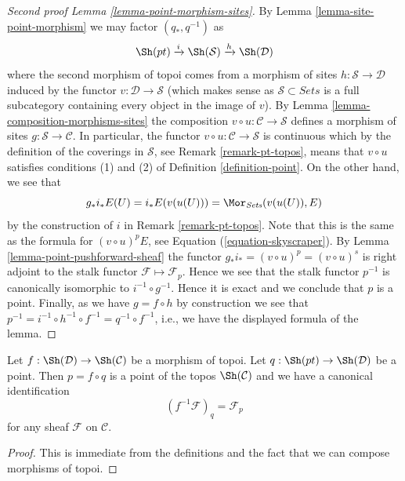 \begin{proof}[Second proof Lemma \ref{lemma-point-morphism-sites}]
By
Lemma \ref{lemma-site-point-morphism}
we may factor $(q_*, q^{-1})$ as
$$
\Sh(pt) \xrightarrow{i} \Sh(\mathcal{S})
\xrightarrow{h} \Sh(\mathcal{D})
$$
where the second morphism of topoi comes from a morphism of sites
$h : \mathcal{S} \to \mathcal{D}$ induced by the functor
$v : \mathcal{D} \to \mathcal{S}$ (which makes sense as
$\mathcal{S} \subset \textit{Sets}$ is a full subcategory containing
every object in the image of $v$). By
Lemma \ref{lemma-composition-morphisms-sites}
the composition $v \circ u : \mathcal{C} \to \mathcal{S}$
defines a morphism of sites $g : \mathcal{S} \to \mathcal{C}$.
In particular, the functor
$v \circ u : \mathcal{C} \to \mathcal{S}$
is continuous which by the definition of the coverings
in $\mathcal{S}$, see
Remark \ref{remark-pt-topos},
means that $v \circ u$ satisfies conditions (1) and (2) of
Definition \ref{definition-point}.
On the other hand, we see that
$$
g_*i_*E(U) = i_*E(v(u(U))) = \Mor_{\textit{Sets}}(v(u(U)), E)
$$
by the construction of $i$ in
Remark \ref{remark-pt-topos}.
Note that this is the same as the formula for
$(v \circ u)^pE$, see
Equation (\ref{equation-skyscraper}).
By
Lemma \ref{lemma-point-pushforward-sheaf}
the functor $g_*i_* = (v \circ u)^p = (v \circ u)^s$
is right adjoint to the stalk functor
$\mathcal{F} \mapsto \mathcal{F}_p$.
Hence we see that the stalk functor $p^{-1}$ is canonically
isomorphic to $i^{-1} \circ g^{-1}$. Hence it is exact and
we conclude that $p$ is a point. Finally, as we have
$g = f \circ h$ by construction we see that
$p^{-1} = i^{-1} \circ h^{-1} \circ f^{-1} = q^{-1} \circ f^{-1}$,
i.e., we have the displayed formula of the lemma.
\end{proof}

\begin{lemma}
\label{lemma-point-morphism-topoi}
Let $f : \Sh(\mathcal{D}) \to \Sh(\mathcal{C})$
be a morphism of topoi. Let $q : \Sh(pt) \to \Sh(\mathcal{D})$
be a point. Then $p = f \circ q$ is a point of the topos
$\Sh(\mathcal{C})$ and we have
a canonical identification
$$
(f^{-1}\mathcal{F})_q = \mathcal{F}_p
$$
for any sheaf $\mathcal{F}$ on $\mathcal{C}$.
\end{lemma}

\begin{proof}
This is immediate from the definitions and the fact that we can
compose morphisms of topoi.
\end{proof}





